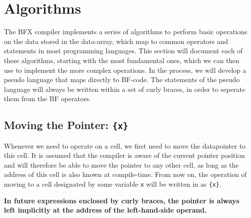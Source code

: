 \section{Algorithms}\label{section:algorithms}
The BFX compiler implements a series of algorithms to perform basic operations on the data stored in the data-array, which map to common operators and statements in most programming languages. This section will document each of these algorithms, starting with the most fundamental ones, which we can then use to implement the more complex operations. In the process, we will develop a pseudo language that maps directly to BF-code. The statements of the pseudo language will always be written within a set of curly braces, in order to seperate them from the BF operators.

\tocless\subsection{Moving the Pointer: \texttt{\{x\}}}
Whenever we need to operate on a cell, we first need to move the datapointer to this cell. It is assumed that the compiler is aware of the current pointer position and will therefore be able to move the pointer to any other cell, as long as the address of this cell is also known at compile-time. From now on, the operation of moving to a cell designated by some variable \texttt{x} will be written in as \texttt{\{x\}}.

\textbf{In future expressions enclosed by curly braces, the pointer is always left implicitly at the address of the left-hand-side operand.}

